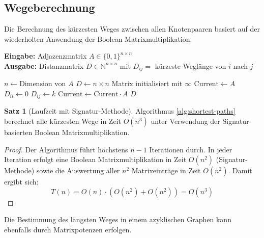 ﻿\documentclass[a4paper,12pt]{article}
\theoremstyle{definition}
\newtheorem{satz}{Satz}
\begin{document}
	\subsection{Wegeberechnung}
	Die Berechnung des kürzesten Weges zwischen allen Knotenpaaren basiert auf der wiederholten Anwendung der Boolean Matrixmultiplikation.
	
	\begin{algorithm}[H]
		\caption{Kürzeste Wege mit Boolean Matrixmultiplikation}
		\label{alg:shortest-paths}
		\textbf{Eingabe:} Adjazenzmatrix $A \in \{0,1\}^{n \times n}$ \\
		\textbf{Ausgabe:} Distanzmatrix $D \in \mathbb{N}^{n \times n}$ mit $D_{ij} = $ kürzeste Weglänge von $i$ nach $j$
		\begin{algorithmic}[1]
			\State $n \gets \text{Dimension von } A$
			\State $D \gets n \times n$ Matrix initialisiert mit $\infty$
			\State $\text{Current} \gets A$
			\State $D_{ii} \gets 0$ 
			\EndFor
			\State $D_{ij} \gets k$ 
			\EndIf
			\EndFor
			\EndFor
			\State $\text{Current} \gets \text{Current} \cdot A$ 
			\EndFor
			\State \Return $D$
		\end{algorithmic}
	\end{algorithm}
	
	\begin{satz}[Laufzeit mit Signatur-Methode]
		Algorithmus \ref{alg:shortest-paths} berechnet alle kürzesten Wege in Zeit $O(n^3)$ unter Verwendung der Signatur-basierten Boolean Matrixmultiplikation.
	\end{satz}
	
	\begin{proof}
		Der Algorithmus führt höchstens $n-1$ Iterationen durch. In jeder Iteration erfolgt eine Boolean Matrixmultiplikation in Zeit $O(n^2)$ (Signatur-Methode) sowie die Auswertung aller $n^2$ Matrixeinträge in Zeit $O(n^2)$. Damit ergibt sich:
		\[
		T(n) = O(n) \cdot (O(n^2) + O(n^2)) = O(n^3)
		\]
	\end{proof}
	
	Die Bestimmung des längsten Weges in einem azyklischen Graphen kann ebenfalls durch Matrixpotenzen erfolgen.
	
\end{document}
